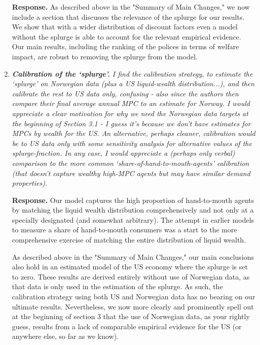 \documentclass[12pt,letterpaper,english]{article}
\begin{document}
\begin{enumerate}
	\noindent \textbf{Response.} As described above in the "Summary of Main Changes," we now include a section that discusses the relevance of the splurge for our results. We show that with a wider distribution of discount factors even a model without the splurge is able to account for the relevant empirical evidence. Our main results, including the ranking of the polices in terms of welfare impact, are robust to removing the splurge from the model. 

	\item \textit{\textbf{Calibration of the `splurge'.} I find the calibration strategy, to estimate the `splurge' on Norwegian data (plus a US liquid-wealth distribution...), and then calibrate the rest to US data only, confusing - also since the authors then compare their final average annual MPC to an estimate for Norway. I would appreciate a clear motivation for why we need the Norwegian data targets at the beginning of Section 3.1 - I guess it's because we don't have estimates for MPCs by wealth for the US. An alternative, perhaps cleaner, calibration would be to US data only with some sensitivity analysis for alternative values of the splurge-fraction. In any case, I would appreciate a (perhaps only verbal) comparison to the more common `share-of-hand-to-mouth-agents' calibration (that doesn't capture wealthy high-MPC agents but may have similar demand properties).}
	
	\noindent \textbf{Response.} Our model captures the high proportion of hand-to-mouth agents by matching the liquid wealth distribution comprehensively and not only at a specially designated (and somewhat arbitrary). The attempt in earlier models to measure a share of hand-to-mouth consumers was a start to the more comprehensive exercise of matching the entire distribution of liquid wealth.
	
	As described above in the "Summary of Main Changes," our main conclusions also hold in an estimated model of the US economy where the splurge is set to zero. These results are derived entirely without use of Norwegian data, as that data is only used in the estimation of the splurge. As such, the calibration strategy using both US and Norwegian data has no bearing on our ultimate results. Nevertheless, we now more clearly and prominently spell out at the beginning of section 3 that the use of Norwegian data, as your rightly guess, results from a lack of comparable empirical evidence for the US (or anywhere else, so far as we know). 
	
\bigskip
\bigskip


\end{enumerate}
\end{document}
